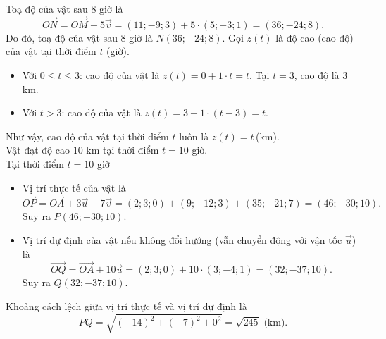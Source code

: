 \begin{ex}
{\begin{itemchoice}
			Toạ độ của vật sau $8$ giờ là
			\[\vec{ON} = \vec{OM} + 5\vec{v} = \left(11;-9;3\right) + 5\cdot\left(5;-3;1\right) = \left(36;-24;8\right).\]
			Do đó, toạ độ của vật sau $8$ giờ là $N(36;-24;8)$.
			\itemch Gọi $z(t)$ là độ cao (cao độ) của vật tại thời điểm $t$ (giờ).
			\begin{itemize}
				\item Với $0 \le t \le 3$: cao độ của vật là $z(t) = 0 + 1 \cdot t = t$. Tại $t=3$, cao độ là $3$ km.
				\item Với $t > 3$: cao độ của vật là $z(t) = 3 + 1 \cdot (t-3) = t$.
			\end{itemize}
			Như vậy, cao độ của vật tại thời điểm $t$ luôn là $z(t) = t$\,(km).\\
			Vật đạt độ cao $10$ km tại thời điểm $t = 10$ giờ.\\
			Tại thời điểm $t = 10$ giờ
			\begin{itemize}
				\item Vị trí thực tế của vật là
				\[\vec{OP} = \vec{OA} + 3\vec{u} + 7\vec{v} = (2;3;0) + (9;-12;3) + (35;-21;7) = (46;-30;10).\]
				Suy ra $P(46;-30;10)$.
				\item Vị trí dự định của vật nếu không đổi hướng (vẫn chuyển động với vận tốc $\vec{u}$) là
				\[\vec{OQ} = \vec{OA} + 10\vec{u} = (2;3;0) + 10\cdot (3;-4;1) = (32;-37;10).\]
				Suy ra $Q(32;-37;10)$.
			\end{itemize}
			Khoảng cách lệch giữa vị trí thực tế và vị trí dự định là
			\[PQ = \sqrt{(-14)^2 + (-7)^2+0^2} = \sqrt{245} \text{ (km)}.\]
		\end{itemchoice}
	}
\end{ex}

